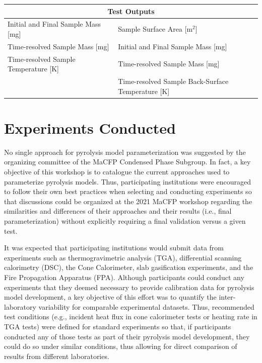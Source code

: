 \documentclass{book}
\begin{document}
\begin{table}[ht]
\begin{center}
\begin{tabular}{ll}
\hline
\multicolumn{2}{c}{Test Outputs}                                                                         \\ \hline
Initial and Final Sample Mass [mg]                & Sample Surface Area [m$^2$]                             \\
Time-resolved Sample Mass [mg]                    & Initial and Final Sample Mass [mg]                   \\
Time-resolved Sample Temperature [K]              & Time-resolved Sample Mass [mg]                       \\
                                                  & Time-resolved Sample Back-Surface Temperature [K]    \\
\hline
\end{tabular}
\end{center}
\end{table}



\chapter{Experiments Conducted}

No single approach for pyrolysis model parameterization was suggested by the organizing committee of the MaCFP Condensed Phase Subgroup. In fact, a key objective of this workshop is to catalogue the current approaches used to parameterize pyrolysis models. Thus, participating institutions were encouraged to follow their own best practices when selecting and conducting experiments so that discussions could be organized at the 2021 MaCFP workshop regarding the similarities and differences of their approaches and their results (i.e., final parameterization) without explicitly requiring a final validation versus a given test.

It was expected that participating institutions would submit data from experiments such as thermogravimetric analysis (TGA), differential scanning calorimetry (DSC), the Cone Calorimeter, slab gasification experiments, and the Fire Propagation Apparatus (FPA). Although participants could conduct any experiments that they deemed necessary to provide calibration data for pyrolysis model development, a key objective of this effort was to quantify the inter-laboratory variability for comparable experimental datasets. Thus, recommended test conditions (e.g., incident heat flux in cone calorimeter tests or heating rate in TGA tests) were defined for standard experiments so that, if participants conducted any of those tests as part of their pyrolysis model development, they could do so under similar conditions, thus allowing for direct comparison of results from different laboratories.
\end{document}
